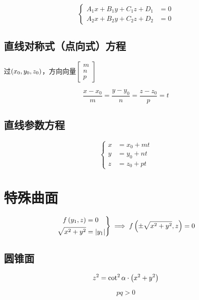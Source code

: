 \documentclass{article}
\begin{document}
\begin{definition}[]
    \[\left\{\begin{aligned}
            A_1x+B_1y+C_1z+D_1 & =0 \\
            A_2x+B_2y+C_2z+D_2 & =0
        \end{aligned}\right.\]
\end{definition}

\subsection{直线对称式（点向式）方程}

过$\left(x_0,y_0,z_0\right)$，方向向量$\begin{bmatrix}m\\n\\p\end{bmatrix}$

\[\frac{x-x_0}m=\frac{y-y_0}n=\frac{z-z_0}p=t\]

\subsection{直线参数方程}

\[\left\{\begin{aligned}
        x & =x_0+mt \\
        y & =y_0+nt \\
        z & =z_0+pt
    \end{aligned}\right.\]

\section{特殊曲面}

\begin{definition}[绕$z$轴旋转曲面：（原曲线为$f\p{y_1,z}=0$）]
    \[\left.\begin{aligned}
            f\left(y_1,z\right)     & =0         \\
            \sqrt{x^2+y^2} & =\left|y_1\right|
        \end{aligned}\right\}
        \implies
        f\left(\pm\sqrt{x^2+y^2},z\right)=0\]
\end{definition}

\subsection{圆锥面}

\[z^2=\cot^2\alpha\cdot\left(x^2+y^2\right)\]

\begin{definition}[以下二次曲面方程中都有]
    \[pq>0\]
\end{definition}
\end{document}
